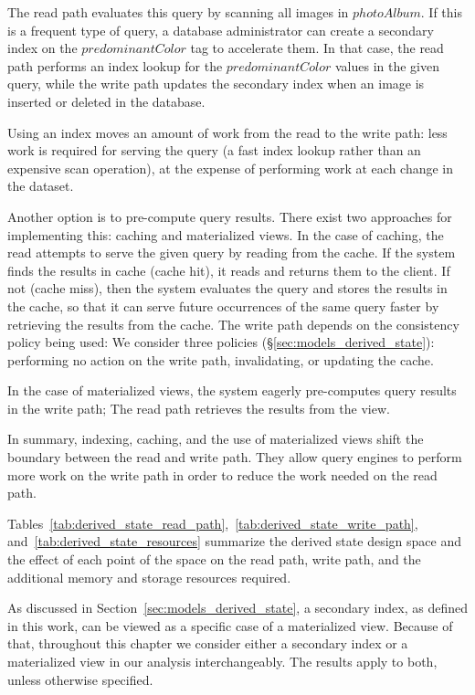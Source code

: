 The read path evaluates this query by scanning all images in $photoAlbum$.
If this is a frequent type of query,
a database administrator can create a secondary index on the $predominantColor$ tag to accelerate them.
In that case, the read path performs an index lookup for the $predominantColor$ values in the given query,
while the write path updates the secondary index when an image is inserted or deleted in the database.

Using an index moves an amount of work from the read to the write path:
less work is required for serving the query (a fast index lookup rather than an expensive scan operation),
at the expense of performing work at each change in the dataset.

Another option is to pre-compute query results.
There exist two approaches for implementing this: caching and materialized views.
In the case of caching, the read attempts to serve the given query by reading from the cache.
If the system finds the results in cache (cache hit), it reads and returns them to the client.
If not (cache miss), then the system evaluates the query and stores the results in the cache,
so that it can serve future occurrences of the same query faster by retrieving the results from the cache.
The write path depends on the consistency policy being used:
We consider three policies (\S\ref{sec:models_derived_state}):
performing no action on the write path, invalidating, or updating the cache.

In the case of materialized views, the system eagerly pre-computes query results in the write path;
The read path retrieves the results from the view.

In summary, indexing, caching, and the use of materialized views shift the boundary between the read and write path.
They allow query engines to perform more work on the write path in order to reduce the work needed on the read path.

Tables~\ref{tab:derived_state_read_path},~\ref{tab:derived_state_write_path}, and~\ref{tab:derived_state_resources} summarize
the derived state design space and the effect of each point of the space on the read path, write path, and the additional
memory and storage resources required.

As discussed in Section~\ref{sec:models_derived_state}, a secondary index,
as defined in this work, can be viewed as a specific case of a materialized view.
Because of that, throughout this chapter we consider either a secondary index or a materialized view in our analysis interchangeably.
The results apply to both, unless otherwise specified.

